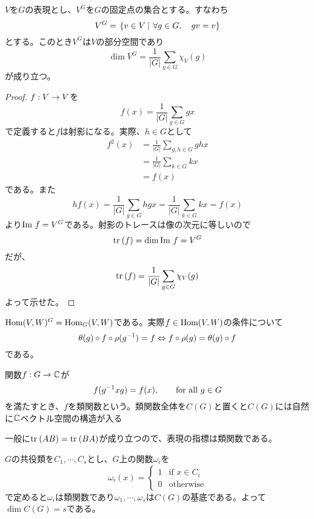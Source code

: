 \documentclass{ltjsarticle}
\begin{document}
\begin{lemm}\label{fix_dim}
  $V$を$G$の表現とし、$V^G$を$G$の固定点の集合とする。すなわち
  \[
  V^G=\left.\left\{v\in V \: \right| \: \forall g\in G,\quad gv=v\right\}  
  \]
  とする。このとき$V^G$は$V$の部分空間であり
  \[
  \dim V^G=\frac{1}{|G|}\sum_{g\in G}\chi_V(g)
  \]
  が成り立つ。
\end{lemm}

\begin{proof}
  $f:V\rightarrow V$を
  \[
  f(x)=\frac{1}{|G|}\sum_{g\in G}gx
  \]
  で定義すると$f$は射影になる。実際、$h\in G$として
  \begin{align*}
    f^2(x)&=\frac{1}{|G|}\sum_{g,h\in G}ghx\\
    &=\frac{1}{|G|}\sum_{k\in G}kx\\
    &=f(x)
  \end{align*}
  である。また
  \[
  hf(x)=\frac{1}{|G|}\sum_{g\in G}hgx=\frac{1}{|G|}\sum_{k\in G}kx=f(x)
  \]
  より$\text{Im } f=V^G$である。射影のトレースは像の次元に等しいので
  \[
  \text{tr}\:(f)=\dim \text{Im } f=V^G  
  \]
  だが、
  \[
  \text{tr}\: (f)=\frac{1}{|G|}\sum_{g\in G}\chi_V(g)  
  \]
  よって示せた。
\end{proof}

\begin{eg}
  $\text{Hom}(V,W)^G=\text{Hom}_G(V,W)$である。実際$f\in \text{Hom}(V,W)$の条件について
  \[
  \theta(g)\circ f \circ \rho(g^{-1})=f\Leftrightarrow f\circ \rho(g)=\theta(g)\circ f
  \]
  である。
\end{eg}




\begin{defin}
  関数$f:G\rightarrow\mathbb{C}$が
  \[
  f(g^{-1}xg)=f(x),\qquad\text{for all $g\in G$}  
  \]
  を満たすとき、$f$を類関数という。類関数全体を$C(G)$と置くと$C(G)$には自然に$\mathbb{C}$ベクトル空間の構造が入る
\end{defin}

\begin{eg}
  一般に$\text{tr}\:(AB)=\text{tr}\:(BA)$が成り立つので、表現の指標は類関数である。
\end{eg}

\begin{eg}
  $G$の共役類を$C_1,\cdots,C_s$とし、$G$上の関数$\omega_i$を
  \[
  \omega_i(x)=\left\{\begin{array}{cl}
    1 & \text{if $x\in C_i$}\\
    0 & \text{otherwise}
  \end{array}\right.  
  \]
  で定めると$\omega_i$は類関数であり$\omega_1,\cdots,\omega_s$は$C(G)$の基底である。よって$\dim C(G)=s$である。
\end{eg}
\end{document}
